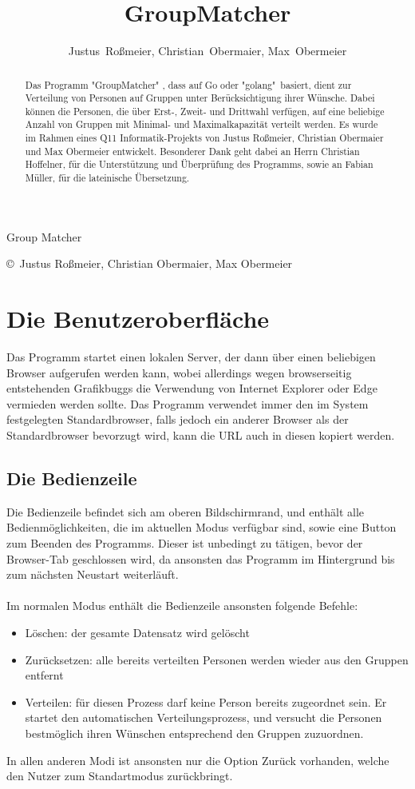\documentclass[a4paper,11pt]{article}
\author{Justus~Roßmeier,
Christian~Obermaier,
Max~Obermeier}
\title{GroupMatcher}
\begin{document}
\begin{center}
\begin{Huge}
Group Matcher \\
\end{Huge}
\vspace{10pt}
\copyright\ Justus Roßmeier,
Christian Obermaier,
Max Obermeier \\
\begin{abstract}
\label{sec:introduction}
Das Programm "GroupMatcher" , dass auf Go oder "golang"\ basiert, dient zur Verteilung von Personen auf Gruppen unter Berücksichtigung ihrer Wünsche.
Dabei können die Personen, die über Erst-, Zweit- und Drittwahl verfügen, auf eine beliebige Anzahl von Gruppen mit Minimal- und Maximalkapazität verteilt werden. Es wurde im Rahmen eines Q11 Informatik-Projekts von Justus Roßmeier, Christian Obermaier und Max Obermeier entwickelt. Besonderer Dank geht dabei an Herrn Christian Hoffelner, für die Unterstützung und Überprüfung des Programms, sowie an Fabian Müller, für die lateinische Übersetzung.
\end{abstract}
\end{center}
\tableofcontents
\section{Die Benutzeroberfläche}
\label{sec:user-interface}
Das Programm startet einen lokalen Server, der dann über einen beliebigen Browser aufgerufen werden kann, wobei allerdings wegen browserseitig entstehenden Grafikbuggs die Verwendung von Internet Explorer oder Edge vermieden werden sollte. Das Programm verwendet immer den im System festgelegten Standardbrowser, falls jedoch ein anderer Browser als der Standardbrowser bevorzugt wird, kann die URL auch in diesen kopiert werden.

\subsection{Die Bedienzeile}
\label{ssec:top-bar}
Die Bedienzeile befindet sich am oberen Bildschirmrand, und enthält alle Bedienmöglichkeiten, die im aktuellen Modus verfügbar sind, sowie eine Button zum Beenden des Programms. Dieser ist unbedingt zu tätigen, bevor der Browser-Tab geschlossen wird, da ansonsten das Programm im Hintergrund bis zum nächsten Neustart weiterläuft. \\ \\
Im normalen Modus enthält die Bedienzeile ansonsten folgende Befehle:
\begin{itemize}
    \item Löschen: der gesamte Datensatz wird gelöscht
    \item Zurücksetzen: alle bereits verteilten Personen werden wieder aus den Gruppen entfernt
    \item Verteilen: für diesen Prozess darf keine Person bereits zugeordnet sein. Er startet den automatischen Verteilungsprozess, und versucht die Personen bestmöglich ihren Wünschen entsprechend den Gruppen zuzuordnen.
\end{itemize}
In allen anderen Modi ist ansonsten nur die Option Zurück vorhanden, welche den Nutzer zum Standartmodus zurückbringt.
\end{document}
